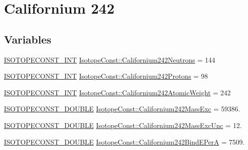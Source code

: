 \hypertarget{group___isotope_const-_californium-_cf242}{}\section{Californium 242}
\label{group___isotope_const-_californium-_cf242}
\subsection*{Variables}
\begin{DoxyCompactItemize}
\item 
\mbox{\hyperlink{group___isotope_const-_macros_ga5f18360b3e99483a35c32d789e62621c}{I\+S\+O\+T\+O\+P\+E\+C\+O\+N\+S\+T\+\_\+\+I\+NT}} \mbox{\hyperlink{group___isotope_const-_californium-_cf242_gac59e237875b40d064180a67ab5ea92cc}{Isotope\+Const\+::\+Californium242\+Neutrons}} = 144
\item 
\mbox{\hyperlink{group___isotope_const-_macros_ga5f18360b3e99483a35c32d789e62621c}{I\+S\+O\+T\+O\+P\+E\+C\+O\+N\+S\+T\+\_\+\+I\+NT}} \mbox{\hyperlink{group___isotope_const-_californium-_cf242_gaba10a757aeac78ea2b4ff94ab5a1beaf}{Isotope\+Const\+::\+Californium242\+Protons}} = 98
\item 
\mbox{\hyperlink{group___isotope_const-_macros_ga5f18360b3e99483a35c32d789e62621c}{I\+S\+O\+T\+O\+P\+E\+C\+O\+N\+S\+T\+\_\+\+I\+NT}} \mbox{\hyperlink{group___isotope_const-_californium-_cf242_ga17ca3a922ad1090fc90deb4e1c0b516f}{Isotope\+Const\+::\+Californium242\+Atomic\+Weight}} = 242
\item 
\mbox{\hyperlink{group___isotope_const-_macros_ga8f45a7272ce02c0b4c65c44636ed719a}{I\+S\+O\+T\+O\+P\+E\+C\+O\+N\+S\+T\+\_\+\+D\+O\+U\+B\+LE}} \mbox{\hyperlink{group___isotope_const-_californium-_cf242_ga795f1b85a42a2842cb341daa5fb31369}{Isotope\+Const\+::\+Californium242\+Mass\+Exc}} = 59386.
\item 
\mbox{\hyperlink{group___isotope_const-_macros_ga8f45a7272ce02c0b4c65c44636ed719a}{I\+S\+O\+T\+O\+P\+E\+C\+O\+N\+S\+T\+\_\+\+D\+O\+U\+B\+LE}} \mbox{\hyperlink{group___isotope_const-_californium-_cf242_gae7bc0c9e281290e30e6c0e68fe41a91e}{Isotope\+Const\+::\+Californium242\+Mass\+Exc\+Unc}} = 12.
\item 
\mbox{\hyperlink{group___isotope_const-_macros_ga8f45a7272ce02c0b4c65c44636ed719a}{I\+S\+O\+T\+O\+P\+E\+C\+O\+N\+S\+T\+\_\+\+D\+O\+U\+B\+LE}} \mbox{\hyperlink{group___isotope_const-_californium-_cf242_gaba69fe236bbf5d408b276b94a6a0138e}{Isotope\+Const\+::\+Californium242\+Bind\+E\+PerA}} = 7509.

\end{DoxyCompactItemize}

